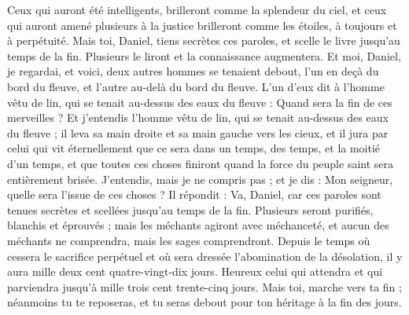 \begin{multicols}{2}
Ceux qui auront été intelligents, brilleront comme la splendeur du ciel, et ceux qui auront amené plusieurs à la justice brilleront comme les étoiles, à toujours et à perpétuité.
Mais toi, Daniel, tiens secrètes ces paroles, et scelle le livre jusqu'au temps de la fin. Plusieurs le liront et la connaissance augmentera.
Et moi, Daniel, je regardai, et voici, deux autres hommes se tenaient debout, l'un en deçà du bord du fleuve, et l'autre au-delà du bord du fleuve.
L’un d’eux dit à l'homme vêtu de lin, qui se tenait au-dessus des eaux du fleuve : Quand sera la fin de ces merveilles ?
Et j'entendis l'homme vêtu de lin, qui se tenait au-dessus des eaux du fleuve ; il leva sa main droite et sa main gauche vers les cieux, et il jura par celui qui vit éternellement que ce sera dans un temps, des temps, et la moitié d’un temps,  et que toutes ces choses finiront quand la force du peuple saint sera entièrement brisée.
J’entendis, mais je ne compris pas ; et je dis : Mon seigneur, quelle sera l'issue de ces choses ?
Il répondit : Va, Daniel, car ces paroles sont tenues secrètes et scellées jusqu'au temps de la fin.
Plusieurs seront purifiés, blanchis et éprouvés ; mais les méchants agiront avec méchanceté, et aucun des méchants ne comprendra, mais les sages comprendront.
Depuis le temps où cessera le sacrifice perpétuel et où sera dressée l'abomination de la désolation, il y aura mille deux cent quatre-vingt-dix jours.
Heureux celui qui attendra et qui parviendra jusqu’à mille trois cent trente-cinq jours.
Mais toi, marche vers ta fin ; néanmoins tu te reposeras, et tu seras debout pour ton héritage à la fin des jours.
\PPE{}
\end{multicols}
